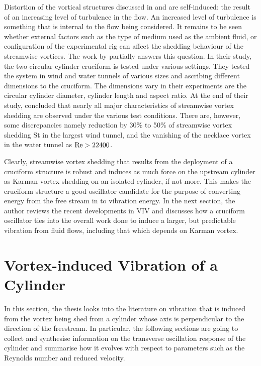 \documentclass[oneside]{utmthesis}
\begin{document}
Distortion of the vortical structures discussed in \citet{Kato2007} and \citet{Koide2017} are self-induced: the result of an increasing level of turbulence in the flow. An increased level of turbulence is something that is internal to the flow being considered. It remains to be seen whether external factors such as the type of medium used as the ambient fluid, or configuration of the experimental rig can affect the shedding behaviour of the streamwise vortices. The work by \citet{Nguyen2010} partially answers this question. In their study, the two-circular cylinder cruciform is tested under various settings. They tested the system in wind and water tunnels of various sizes and ascribing different dimensions to the cruciform. The dimensions \citet{Nguyen2010} vary in their experiments are the circular cylinder diameter, cylinder length and aspect ratio. At the end of their study, \citet{Nguyen2010} concluded that nearly all major characteristics of streamwise vortex shedding are observed under the various test conditions. There are, however, some discrepancies namely reduction by 30\% to 50\% of streamwise vortex shedding St in the largest wind tunnel, and the vanishing of the necklace vortex in the water tunnel as $\text{Re} > 22400$.

Clearly, streamwise vortex shedding that results from the deployment of a cruciform structure is robust and induces as much force on the upstream cylinder as Karman vortex shedding on an isolated cylinder, if not more. This makes the cruciform structure a good oscillator candidate for the purpose of converting energy from the free stream in to vibration energy. In the next section, the author reviews the recent developments in VIV and discusses how a cruciform oscillator ties into the overall work done to induce a larger, but predictable vibration from fluid flows, including that which depends on Karman vortex.

\section{Vortex-induced Vibration of a Cylinder} \label{sec:cylinderVIV}
In this section, the thesis looks into the literature on vibration that is induced from the vortex being shed from a cylinder whose axis is perpendicular to the direction of the freestream. In particular, the following sections are going to collect and synthesise information on the transverse oscillation response of the cylinder and summarise how it evolves with respect to parameters such as the Reynolds number and reduced velocity.
\end{document}
